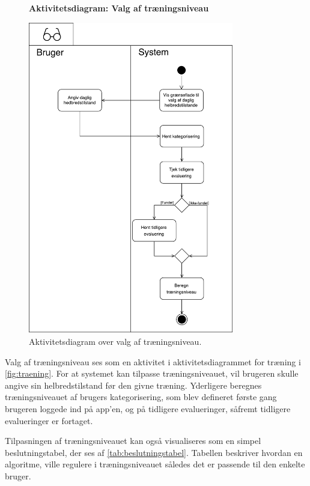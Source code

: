 \begin{figure} [H]
\centering
\textbf{Aktivitetsdiagram: Valg af træningsniveau}\par\medskip
\includegraphics[width=0.8\textwidth]{figures/aktivitetsdiagram/Tilpasningaftraeningsniveau}
\caption{Aktivitetsdiagram over valg af træningsniveau.}
\label{fig:traeningsniveau}
\end{figure}

\noindent
Valg af træningsniveau ses som en aktivitet i aktivitetsdiagrammet for træning i \autoref{fig:traening}. For at systemet kan tilpasse træningsniveauet, vil brugeren skulle angive sin helbredstilstand før den givne træning. Yderligere beregnes træningsniveauet af brugers kategorisering, som blev defineret første gang brugeren loggede ind på app'en, og på tidligere evalueringer, såfremt tidligere evalueringer er fortaget.


Tilpasningen af træningsniveauet kan også visualiseres som en simpel beslutningstabel, der ses af \autoref{tab:beslutningstabel}. Tabellen beskriver hvordan en algoritme, ville regulere i træningsniveauet således det er passende til den enkelte bruger.  

